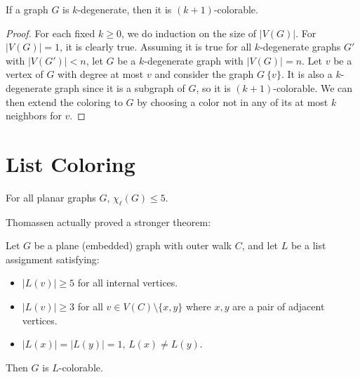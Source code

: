\begin{proposition}
If a graph $G$ is $k$-degenerate, then it is $(k+1)$-colorable.
\end{proposition}

\begin{proof}
For each fixed $k \geq 0$, we do induction on the size of $|V(G)|$. For $|V(G)| = 1$, it is clearly true. Assuming it is true for all $k$-degenerate graphs $G'$ with $|V(G')| < n$, let $G$ be a $k$-degenerate graph with $|V(G)| = n$. Let $v$ be a vertex of $G$ with degree at most $v$ and consider the graph $G \ \{v\}$. It is also a $k$-degenerate graph since it is a subgraph of $G$, so it is $(k+1)$-colorable. We can then extend the coloring to $G$ by choosing a color not in any of its at most $k$ neighbors for $v$.
\end{proof}





\section{List Coloring}




\cite{thomassenplanargraphchoosable}

\begin{theorem}
\label{thomassentheorem}
For all planar graphs $G$, $\chi_{\ell}(G) \leq 5$.
\end{theorem}

Thomassen actually proved a stronger theorem: 

\begin{theorem}
\label{thomassenstrongertheorem}
	Let $G$ be a plane (embedded) graph with outer walk $C$, and let $L$ be a list assignment satisfying:
\begin{itemize}
	\item $|L(v)| \geq 5$ for all internal vertices.
	\item $|L(v)| \geq 3$ for all $v \in V(C) \setminus \{x, y\}$ where $x, y$ are a pair of adjacent vertices.
	\item $|L(x)| = |L(y)| = 1$, $L(x) \neq L(y)$. 
\end{itemize}	
	Then $G$ is $L$-colorable.
\end{theorem}

